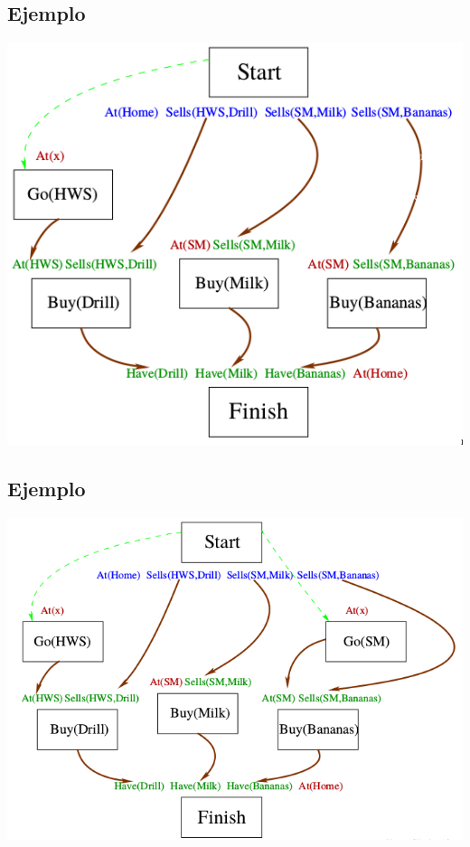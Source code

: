 \documentclass[11pt]{article}
\begin{document}
\subsection*{Ejemplo}
\label{sec:org156194c}

\begin{center}
\includegraphics[width=.9\linewidth]{imagenes/pop9.png}
\end{center}

\subsection*{Ejemplo}
\label{sec:org1fb4f4b}

\begin{center}
\includegraphics[width=.9\linewidth]{imagenes/pop10.png}
\end{center}
\end{document}
